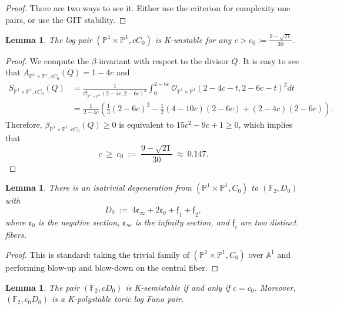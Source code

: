 \documentclass[a4paper,12pt]{amsart}
\newcommand{\mtc}[1]{\mathcal{#1}}
\newcommand{\mtf}[1]{\mathfrak{#1}}
\newcommand{\bF}{\mathbb{F}}
\newcommand{\bA}{{\mathbb A}}
\newcommand{\bP}{{\mathbb P}}
\newtheorem{lemma}[theorem]{Lemma}
\theoremstyle{definition}
\theoremstyle{remark}
\begin{document}
\begin{proof}
    There are two ways to see it. Either use the criterion for complexity one pairs, or use the GIT stability.
\end{proof}

\begin{lemma}\label{lem: necessary condition for K-ss}
    The log pair $(\bP^1\times\bP^1,cC_0)$ is K-unstable for any $c>c_0:=\frac{9-\sqrt{21}}{30}$.
\end{lemma}

\begin{proof}
    We compute the $\beta$-invariant with respect to the divisor $Q$. It is easy to see that $A_{\bP^1\times\bP^1,cC_0}(Q)=1-4c$ and \begin{equation}\nonumber
   \begin{split}
    S_{\bP^1\times\bP^1,cC_0}(Q)&=\frac{1}{\mtc{O}_{\bP^1\times\bP^1}(2-4c,2-6c)^2}\int_0^{2-6c}\mtc{O}_{\bP^1\times\bP^1}(2-4c-t,2-6c-t)^2dt\\
    &=\frac{1}{2-4c}\left(\frac{1}{3}(2-6c)^2-\frac{1}{2}(4-10c)(2-6c)+(2-4c)(2-6c)\right).
    \end{split}
    \end{equation}
    Therefore, $\beta_{\bP^1\times\bP^1,cC_0}(Q)\geq0$ is equivalent to $15c^2-9c+1\geq0$, which implies that $$c\ \geq\ c_0\ :=\ \frac{9-\sqrt{21}}{30}\ \approx\  0.147.$$
\end{proof}


\begin{lemma}
    There is an isotrivial degeneration from $(\bP^1\times\bP^1,C_0)$ to $(\bF_2,D_0)$ with $$D_0 \ := \ 4\mtf{e}_{\infty}+2\mtf{e}_0+\mtf{f}_1+\mtf{f}_2,$$ where $\mtf{e}_0$ is the negative section, $\mtf{e}_{\infty}$ is the infinity section, and $\mtf{f}_i$ are two distinct fibers.
\end{lemma}

\begin{proof}
    This is standard: taking the trivial family of $(\bP^1\times\bP^1,C_0)$ over $\bA^1$ and performing blow-up and blow-down on the central fiber.
\end{proof}

\begin{lemma}
    The pair $(\bF_2,cD_0)$ is K-semistable if and only if $c=c_0$. Moreover, $(\bF_2,c_0D_0)$ is a K-polystable toric log Fano pair.
\end{lemma}
\end{document}
